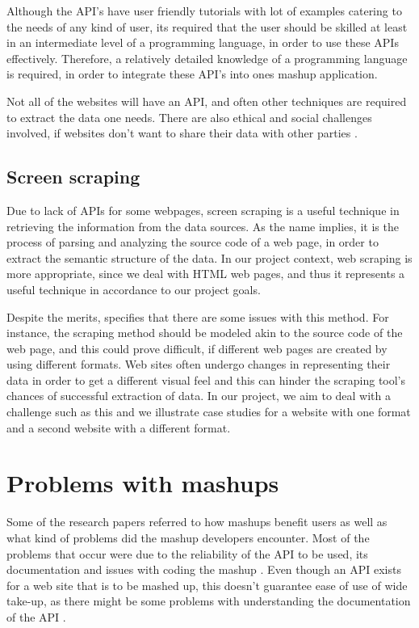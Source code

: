 Although the API’s have user friendly tutorials with lot of examples catering to the needs of any kind of user, its required that the user should be skilled at least in an intermediate level of a programming language, in order to use these APIs effectively. Therefore, a relatively detailed knowledge of a  programming language is required, in order to integrate these API’s into ones mashup application.

Not all of the websites will have an API, and often other techniques are required to extract the data one needs. There are also ethical and social challenges involved, if websites don’t want to share their data with other parties \cite{4}.

\subsection{Screen scraping}
Due to lack of APIs for some webpages, screen scraping is a useful technique in retrieving the information from the data sources. As the name implies, it is the process of parsing and analyzing the source code of a web page, in order to extract the semantic structure of the data. In our project context, web scraping is more appropriate, since we deal with HTML web pages, and thus it represents a useful technique in accordance to our project goals.

Despite the merits, \cite{4} specifies that there are some issues with this method. For instance, the scraping method should be modeled akin to the source code of the web page, and this could prove difficult, if different web pages are created by using different formats. Web sites often undergo changes in representing their data in order to get a different visual feel and this can hinder the scraping tool’s chances of successful extraction of data. In our project, we aim to deal with a challenge such as this and we illustrate case studies for a website with one format and a second website with a different format.


\section{Problems with mashups}
Some of the research papers referred to how mashups benefit users as well as what kind of problems did the mashup developers encounter. Most of the problems that occur were due to the reliability of the API to be used, its documentation and issues with coding the mashup \cite{8}. Even though an API exists for a web site that is to be mashed up, this doesn't guarantee ease of use of wide take-up, as there might be some problems with understanding the documentation of the API \cite{19}.

